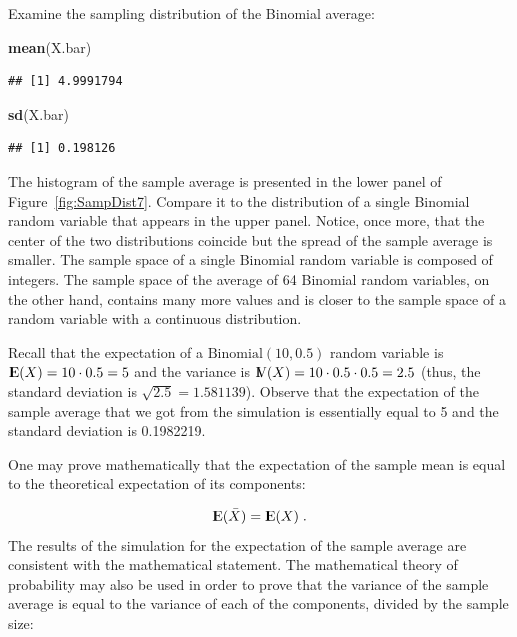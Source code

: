 \documentclass[]{krantz}
\makeatletter
\newenvironment{Shaded}{\begin{snugshade}}{\end{snugshade}}
\newcommand{\KeywordTok}[1]{\textcolor[rgb]{0.13,0.29,0.53}{\textbf{#1}}}
\newcommand{\NormalTok}[1]{#1}
\newcommand{\Expec}{{\rm I\kern-.3em E}}
\newcommand{\Var}{{\rm I\kern-.3em V}}
\newenvironment{kframe}{%
\medskip{}
\setlength{\fboxsep}{.8em}
 \def\at@end@of@kframe{}%
 \ifinner\ifhmode%
  \def\at@end@of@kframe{\end{minipage}}%
  \begin{minipage}{\columnwidth}%
 \fi\fi%
 \def\FrameCommand##1{\hskip\@totalleftmargin \hskip-\fboxsep
 \colorbox{shadecolor}{##1}\hskip-\fboxsep
     \hskip-\linewidth \hskip-\@totalleftmargin \hskip\columnwidth}%
 \MakeFramed {\advance\hsize-\width
   \@totalleftmargin\z@ \linewidth\hsize
   \@setminipage}}%
 {\par\unskip\endMakeFramed%
 \at@end@of@kframe}
\renewenvironment{Shaded}{\begin{kframe}}{\end{kframe}}
\theoremstyle{definition}
\theoremstyle{definition}
\theoremstyle{definition}
\theoremstyle{remark}
\makeatother
\begin{document}
Examine the sampling distribution of the Binomial average:

\begin{Shaded}
\begin{Highlighting}[]
\KeywordTok{mean}\NormalTok{(X.bar)}
\end{Highlighting}
\end{Shaded}

\begin{verbatim}
## [1] 4.9991794
\end{verbatim}

\begin{Shaded}
\begin{Highlighting}[]
\KeywordTok{sd}\NormalTok{(X.bar)}
\end{Highlighting}
\end{Shaded}

\begin{verbatim}
## [1] 0.198126
\end{verbatim}

The histogram of the sample average is presented in the lower panel of
Figure~\ref{fig:SampDist7}. Compare it to the distribution of a single
Binomial random variable that appears in the upper panel. Notice, once
more, that the center of the two distributions coincide but the spread
of the sample average is smaller. The sample space of a single Binomial
random variable is composed of integers. The sample space of the average
of 64 Binomial random variables, on the other hand, contains many more
values and is closer to the sample space of a random variable with a
continuous distribution.

Recall that the expectation of a \(\mathrm{Binomial}(10,0.5)\) random
variable is \(\Expec(X) = 10 \cdot 0.5 = 5\) and the variance is
\(\Var(X) = 10 \cdot 0.5 \cdot 0.5 = 2.5\) (thus, the standard deviation
is \(\sqrt{2.5} = 1.581139\)). Observe that the expectation of the
sample average that we got from the simulation is essentially equal to 5
and the standard deviation is 0.1982219.

One may prove mathematically that the expectation of the sample mean is
equal to the theoretical expectation of its components:

\[\Expec(\bar X) = \Expec(X)\;.\] The results of the simulation for the
expectation of the sample average are consistent with the mathematical
statement. The mathematical theory of probability may also be used in
order to prove that the variance of the sample average is equal to the
variance of each of the components, divided by the sample size:
\end{document}
